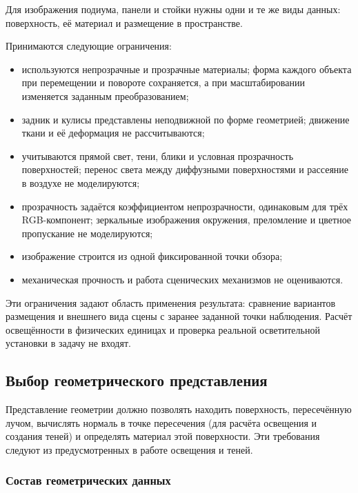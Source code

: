 Для изображения подиума, панели и стойки нужны одни и те же виды данных: поверхность, её материал и размещение в пространстве.

Принимаются следующие ограничения:
\begin{itemize}[beginpenalty=10000]
  \item используются непрозрачные и прозрачные материалы; форма каждого объекта при перемещении и повороте сохраняется, а при масштабировании изменяется заданным преобразованием;
  \item задник и кулисы представлены неподвижной по форме геометрией; движение ткани и её деформация не рассчитываются;
  \item учитываются прямой свет, тени, блики и условная прозрачность поверхностей; перенос света между диффузными поверхностями и рассеяние в воздухе не моделируются;
  \item прозрачность задаётся коэффициентом непрозрачности, одинаковым для трёх RGB-компонент; зеркальные изображения окружения, преломление и цветное пропускание не моделируются;
  \item изображение строится из одной фиксированной точки обзора;
  \item механическая прочность и работа сценических механизмов не оцениваются.
\end{itemize}

Эти ограничения задают область применения результата: сравнение вариантов размещения и внешнего вида сцены с заранее заданной точки наблюдения. Расчёт освещённости в физических единицах и проверка реальной осветительной установки в задачу не входят.

\subsection{Выбор геометрического представления}
\label{subsec:geometry}

Представление геометрии должно позволять находить поверхность, пересечённую лучом, вычислять нормаль в точке пересечения (для расчёта освещения и создания теней) и определять материал этой поверхности. Эти требования следуют из предусмотренных в работе освещения и теней.

\subsubsection{Состав геометрических данных}

